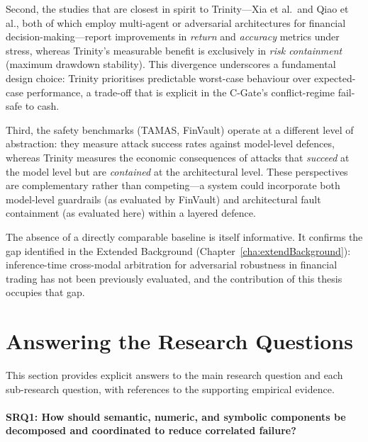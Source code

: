Second, the studies that are closest in spirit to Trinity---Xia et al.\ and
Qiao et al., both of which employ multi-agent or adversarial architectures for
financial decision-making---report improvements in \emph{return} and
\emph{accuracy} metrics under stress, whereas Trinity's measurable benefit is
exclusively in \emph{risk containment} (maximum drawdown stability). This
divergence underscores a fundamental design choice: Trinity prioritises
predictable worst-case behaviour over expected-case performance, a trade-off
that is explicit in the C-Gate's conflict-regime fail-safe to cash.

Third, the safety benchmarks (TAMAS, FinVault) operate at a different level
of abstraction: they measure attack success rates against model-level defences,
whereas Trinity measures the economic consequences of attacks that
\emph{succeed} at the model level but are \emph{contained} at the
architectural level. These perspectives are complementary rather than
competing---a system could incorporate both model-level guardrails (as
evaluated by FinVault) and architectural fault containment (as evaluated here)
within a layered defence.

The absence of a directly comparable baseline is itself informative. It
confirms the gap identified in the Extended Background
(Chapter~\ref{cha:extendBackground}): inference-time cross-modal arbitration
for adversarial robustness in financial trading has not been previously
evaluated, and the contribution of this thesis occupies that gap.

\section{Answering the Research Questions}
\label{sec:disc-rq}

This section provides explicit answers to the main research question and each
sub-research question, with references to the supporting empirical evidence.

\paragraph{SRQ1: How should semantic, numeric, and symbolic components be
decomposed and coordinated to reduce correlated failure?}

